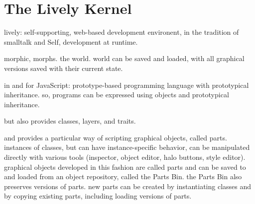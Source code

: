 \section{The Lively Kernel}

lively: self-supporting, web-based development environent, in the tradition of smalltalk and Self, development at runtime.

morphic, morphs. the world. world can be saved and loaded, with all graphical versions saved with their current state.

in and for JavaScript: prototype-based programming language with prototypical inheritance.
so, programs can be expressed using objects and prototypical inheritance.

but also provides classes, layers, and traits. 

and provides a particular way of scripting graphical objects, called parts.
instances of classes, but can have instance-specific behavior, can be manipulated directly with various tools (inspector, object editor, halo buttons, style editor).
graphical objects developed in this fashion are called parts and can be saved to and loaded from an object repository, called the Parts Bin.
the Parts Bin also preserves versions of parts.
new parts can be created by instantiating classes and by copying existing parts, including loading versions of parts.






